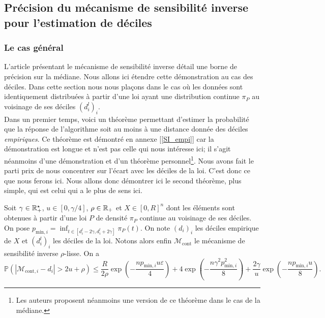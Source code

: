 \subsection{Précision du mécanisme de sensibilité inverse pour l'estimation de déciles}

\subsubsection{Le cas général}

L'article présentant le mécanisme de sensibilité inverse \cite{Asi2020NearII} détail une borne de précision sur la médiane. Nous allons ici étendre cette démonstration au cas des déciles. Dans cette section nous nous plaçons dans le cas où les données sont identiquement distribuées à partir d'une loi ayant une distribution continue \(\pi_P\) au voisinage de ses déciles \((d_i^l)_i\).\\

Dans un premier temps, voici un théorème permettant d'estimer la probabilité que la réponse de l'algorithme soit au moins à une distance donnée des déciles \textit{empiriques}. Ce théorème est démontré en annexe [\ref{SI_empi}] car la démonstration est longue et n'est pas celle qui nous intéresse ici; il s'agit néanmoins d'une démonstration et d'un théorème personnel\footnote{Les auteurs proposent néanmoins une version de ce théorème dans le cas de la médiane.}. Nous avons fait le parti prix de nous concentrer sur l'écart avec les déciles de la loi. C'est donc ce que nous ferons ici. Nous allons donc démontrer ici le second théorème, plus simple, qui est celui qui a le plus de sens ici. \\


\begin{theorem}
    Soit \(\gamma \in \mathbb{R}_+^\star\), \(u \in [0, \gamma/4]\), \(\rho \in \mathbb{R}_+\) et \(X \in [0,R]^n\) dont les éléments sont obtenues à partir d'une loi \(P\) de densité \(\pi_P\) continue au voisinage de ses déciles. On pose \(p_{\text{min}, i} = \inf_{t \in [d_i^l - 2\gamma, d_i^l + 2\gamma]} \pi_P(t)\). On note \((d_i)_i\) les déciles empirique de \(X\) et \((d_i^l)_i\) les déciles de la loi. Notons alors enfin \(\mathcal M_{\text{cont}}\) le mécanisme de sensibilité inverse \(\rho\)-lisse. On a
    \[
        \mathbb P\left( |\mathcal M_{\text{cont}, i} - d_i| > 2u + \rho\right) \leq \dfrac{R}{2\rho}\exp\left(- \dfrac{np_{\text{min}, i}u\varepsilon}{4} \right) + 4\exp\left(- \dfrac{n\gamma^2p_{\text{min},i}^2}{8} \right) + \dfrac{2\gamma}{u}\exp\left( -\dfrac{np_{\text{min},i}u}{8} \right).
    \]
\end{theorem}


